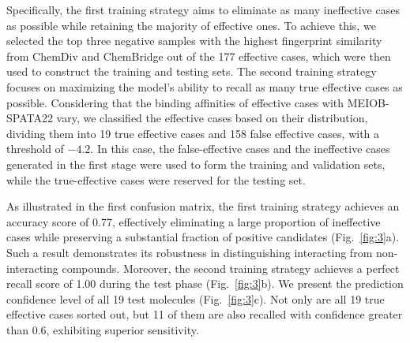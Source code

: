 \documentclass[unnumsec,webpdf,contemporary,large]{oup-authoring-template}%
\theoremstyle{thmstyleone}%
\theoremstyle{thmstyletwo}%
\theoremstyle{thmstylethree}%
\begin{document}
Specifically, the first training strategy aims to eliminate as many ineffective cases as possible while retaining the majority of effective ones. To achieve this, we selected the top three negative samples with the highest fingerprint similarity from ChemDiv and ChemBridge out of the 177 effective cases, which were then used to construct the training and testing sets. The second training strategy focuses on maximizing the model's ability to recall as many true effective cases as possible. Considering that the binding affinities of effective cases with MEIOB-SPATA22 vary, we classified the effective cases based on their distribution, dividing them into 19 true effective cases and 158 false effective cases, with a threshold of $-4.2$. In this case, the false-effective cases and the ineffective cases generated in the first stage were used to form the training and validation sets, while the true-effective cases were reserved for the testing set.

As illustrated in the first confusion matrix, the first training strategy achieves an accuracy score of 0.77, effectively eliminating a large proportion of ineffective cases while preserving a substantial fraction of positive candidates (Fig.~\ref{fig:3}a). Such a result demonstrates its robustness in distinguishing interacting from non-interacting compounds. Moreover, the second training strategy achieves a perfect recall score of 1.00 during the test phase (Fig.~\ref{fig:3}b). We present the prediction confidence level of all 19 test molecules (Fig.~\ref{fig:3}c). Not only are all 19 true effective cases sorted out, but 11 of them are also recalled with confidence greater than 0.6, exhibiting superior sensitivity. 
\end{document}
